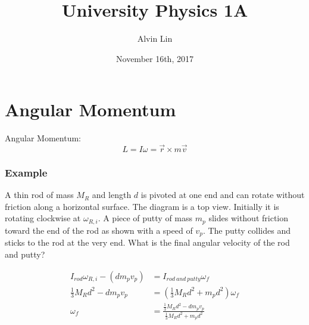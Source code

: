 \documentclass{math}
\title{University Physics 1A}
\author{Alvin Lin}
\date{November 16th, 2017}
\begin{document}
\maketitle

\section*{Angular Momentum}
Angular Momentum:
\[ L = I\omega = \vec{r}\times m\vec{v} \]

\subsubsection*{Example}
A thin rod of mass \( M_R \) and length \( d \) is pivoted at one end and can
rotate without friction along a horizontal surface. The diagram is a top view.
Initially it is rotating clockwise at \( \omega_{R,i} \). A piece of putty of
mass \( m_p \) slides without friction toward the end of the rod as shown with
a speed of \( v_p \). The putty collides and sticks to the rod at the very end.
What is the final angular velocity of the rod and putty?
\begin{center}
\end{center}
\begin{align*}
  I_{rod}\omega_{R,i}-(dm_pv_p) &= I_{rod~and~putty}\omega_f \\
  \frac{1}{3}M_Rd^2-dm_pv_p &= (\frac{1}{3}M_Rd^2+m_pd^2)\omega_f \\
  \omega_f &= \frac{\frac{1}{3}M_Rd^2-dm_pv_p}{\frac{1}{3}M_Rd^2+m_pd^2}
\end{align*}
\end{document}
